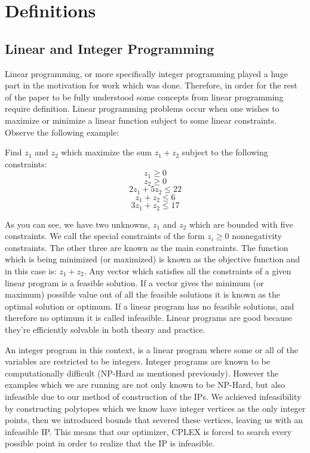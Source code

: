 \documentclass[11pt]{article} %
\theoremstyle{definition}
\theoremstyle{remark}
\begin{document}
\section{Definitions}

\subsection{Linear and Integer Programming}

Linear programming, or more specifically integer programming played a huge part in the motivation for work which was done. Therefore, in order for the rest of the paper to be fully understood some concepts from linear programming require definition. Linear programming problems occur when one wishes to maximize or minimize a linear function subject to some linear constraints. Observe the following example:

Find $z_1$ and $z_2$ which maximize the sum $z_1 + z_2$ subject to the following constraints:
$$z_1 \geq 0$$
$$z_2 \geq 0$$
$$2z_1 + 5z_2 \leq 22 $$
$$z_1 + z_2 \leq 6$$ 
$$3z_1 + z_2 \leq 17$$

As you can see, we have two unknowns, $z_1$ and $z_2$ which are bounded with five constraints. We call the special constraints of the form $z_i \geq 0$ nonnegativity constraints. The other three are known as the main constraints.  The function which is being minimized (or maximized) is known as the objective function and in this case is: $z_1 + z_2$. Any vector which satisfies all the constraints of a given linear program is a feasible solution. If a vector gives the minimum (or maximum) possible value out of all the feasible solutions it is known as the optimal solution or optimum. If a linear program has no feasible solutions, and therefore no optimum it is called infeasible. Linear programs are good because they're efficiently solvable in both theory and practice. 

An integer program in this context, is a linear program where some or all of the variables are restricted to be integers. Integer programs are known to be computationally difficult (NP-Hard as mentioned previously). However the examples which we are running are not only known to be NP-Hard, but also infeasible due to our method of construction of the IPs. We achieved infeasibility by constructing polytopes which we know have integer vertices as the only integer points, then we introduced bounds that severed these vertices, leaving us with an infeasible IP. This means that our optimizer, CPLEX is forced to search every possible point in order to realize that the IP is infeasible. 
\end{document}

